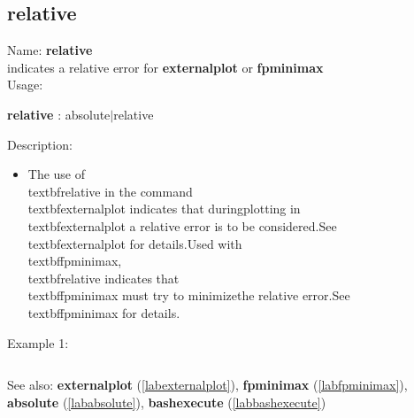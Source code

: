 \subsection{relative}
\label{labrelative}
\noindent Name: \textbf{relative}\\
indicates a relative error for \textbf{externalplot} or \textbf{fpminimax}\\
\noindent Usage: 
\begin{center}
\textbf{relative} : \textsf{absolute$|$relative}\\
\end{center}
\noindent Description: \begin{itemize}

\item The use of \\textbf{relative} in the command \\textbf{externalplot} indicates that during\n   plotting in \\textbf{externalplot} a relative error is to be considered.\n    \n   See \\textbf{externalplot} for details.\n   Used with \\textbf{fpminimax}, \\textbf{relative} indicates that \\textbf{fpminimax} must try to minimize\n   the relative error.\n    \n   See \\textbf{fpminimax} for details.\n\end{itemize}
\noindent Example 1: 
\begin{center}\begin{minipage}{15cm}\begin{Verbatim}[frame=single]
\end{Verbatim}
\end{minipage}\end{center}
See also: \textbf{externalplot} (\ref{labexternalplot}), \textbf{fpminimax} (\ref{labfpminimax}), \textbf{absolute} (\ref{lababsolute}), \textbf{bashexecute} (\ref{labbashexecute})
